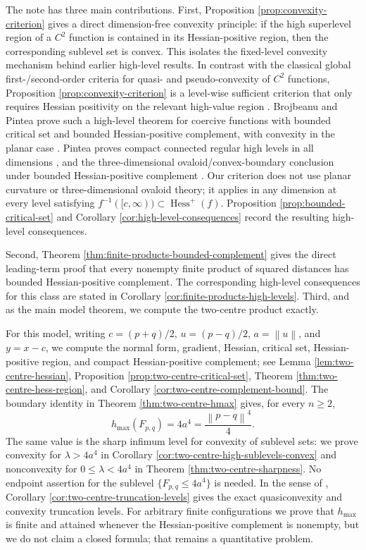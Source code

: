 \documentclass[11pt]{amsart}
\theoremstyle{remark}
\newcommand{\Hessp}{\operatorname{Hess}^{+}}
\newcommand{\norm}[1]{\left\lVert #1\right\rVert}
\begin{document}
The note has three main contributions. First, Proposition
\ref{prop:convexity-criterion} gives a direct dimension-free convexity
principle: if the high superlevel region of a $C^2$ function is contained in
its Hessian-positive region, then the corresponding sublevel set is convex. 
This isolates the fixed-level convexity mechanism behind earlier high-level
results. In contrast with the classical global first-/second-order criteria for quasi- and pseudo-convexity of $C^2$ functions, Proposition \ref{prop:convexity-criterion} is a level-wise sufficient criterion that only requires Hessian positivity on the relevant high-value region \cite{CrouzeixFerland1982Criteria}. Brojbeanu and Pintea prove such a high-level theorem for coercive
functions with bounded critical set and bounded Hessian-positive complement,
with convexity in the planar case \cite[Theorem 3.7]{BrojbeanuPintea2022HessPlus}.
Pintea proves compact connected regular high levels in all dimensions
\cite[Theorem~2.1]{Pintea2022LevelSets}, and the three-dimensional
ovaloid/convex-boundary conclusion under bounded Hessian-positive complement
\cite[Theorem~3.4 and Corollary~3.6]{Pintea2022LevelSets}. Our criterion does
not use planar curvature or three-dimensional ovaloid theory; it applies in
any dimension at every level satisfying
$f^{-1}([c,\infty))\subset\Hessp(f)$. Proposition
\ref{prop:bounded-critical-set} and Corollary
\ref{cor:high-level-consequences} record the resulting high-level
consequences.

Second, Theorem \ref{thm:finite-products-bounded-complement} gives the direct
leading-term proof that every nonempty finite product of squared distances has
bounded Hessian-positive complement. The corresponding high-level consequences
for this class are stated in Corollary \ref{cor:finite-products-high-levels}.
Third, and as the main model theorem, we compute the two-centre product
exactly.

For this model, writing
$c=(p+q)/2$, $u=(p-q)/2$, $a=\norm{u}$, and $y=x-c$, we compute the
normal form, gradient, Hessian, critical set, Hessian-positive region, and
compact Hessian-positive complement; see Lemma \ref{lem:two-centre-hessian},
Proposition \ref{prop:two-centre-critical-set}, Theorem
\ref{thm:two-centre-hess-region}, and Corollary
\ref{cor:two-centre-complement-bound}. The boundary identity in Theorem
\ref{thm:two-centre-hmax} gives, for every $n \geq 2$,
\[
 h_{\max}(F_{p,q})=4a^4=\frac{\norm{p-q}^4}{4}.
\]
The same value is the sharp infimum level for convexity of sublevel sets: we
prove convexity for $\lambda>4a^4$ in Corollary
\ref{cor:two-centre-high-sublevels-convex} and nonconvexity for
$0\le\lambda<4a^4$ in Theorem \ref{thm:two-centre-sharpness}. No endpoint
assertion for the sublevel $\{F_{p,q}\le4a^4\}$ is needed. In the sense of
\cite{Pintea2026Cqt}, Corollary \ref{cor:two-centre-truncation-levels} gives
the exact quasiconvexity and convexity truncation levels. For arbitrary finite
configurations we prove that $h_{\max}$ is finite and attained whenever the
Hessian-positive complement is nonempty, but we do not claim a closed formula;
that remains a quantitative problem.
\end{document}
